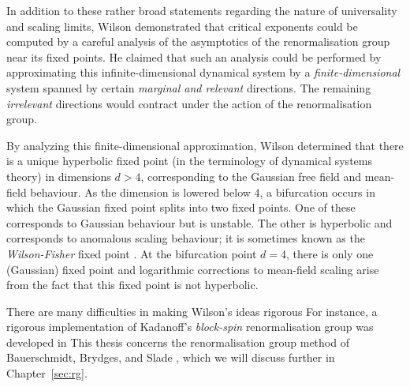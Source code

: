 In addition to these rather broad statements regarding the nature of universality
and scaling limits, Wilson demonstrated that critical exponents could be computed
by a careful analysis of the asymptotics of the renormalisation group near its
fixed points. He claimed that such an analysis could be performed by approximating
this infinite-dimensional dynamical system by a \emph{finite-dimensional} system
spanned by certain \emph{marginal and relevant} directions. The remaining \emph{irrelevant}
directions would contract under the action of the renormalisation group.

By analyzing this finite-dimensional approximation, Wilson determined that there
is a unique hyperbolic fixed point (in the terminology of dynamical systems theory)
in dimensions $d > 4$, corresponding to the Gaussian
free field and mean-field behaviour. As the dimension is lowered below $4$, a
bifurcation occurs in which the Gaussian fixed point splits into two fixed points.
One of these corresponds to Gaussian behaviour but is unstable. The other is hyperbolic and
corresponds to anomalous scaling behaviour; it is sometimes known as the
\emph{Wilson-Fisher} fixed point \cite{WF72}. At the bifurcation point $d = 4$, there is only
one (Gaussian) fixed point and logarithmic corrections to mean-field scaling arise
from the fact that this fixed point is not hyperbolic.

There are many difficulties in making Wilson's ideas rigorous  %
For instance, a rigorous implementation of Kadanoff's \emph{block-spin}
renormalisation group was developed in \cite{GK85}
This thesis concerns the renormalisation group method of Bauerschmidt,
Brydges, and Slade \cite{BS-rg-norm,BS-rg-loc,BBS-rg-pt,BS-rg-IE,BS-rg-step},
which we will discuss further in Chapter~\ref{sec:rg}.

